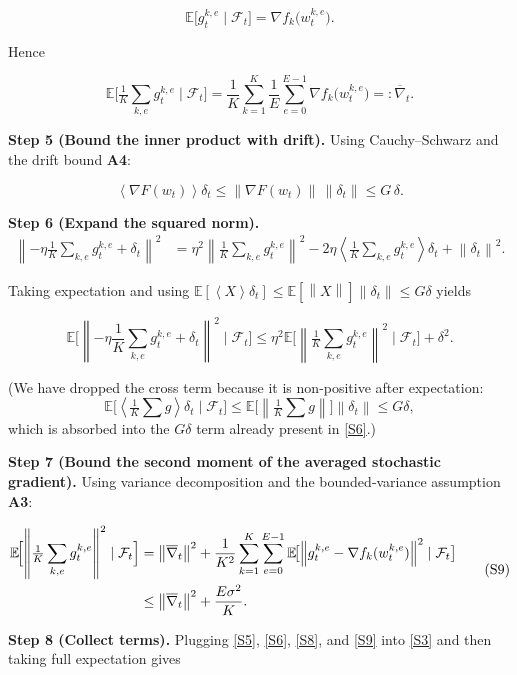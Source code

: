 \documentclass{article}
\newcommand{\E}{\mathbb{E}}
\newcommand{\norm}[1]{\left\lVert #1\right\rVert}
\newcommand{\inner}[1]{\left\langle #1\right\rangle}
\begin{document}
\[
\E\!\bigl[g_{t}^{k,e}\mid\mathcal{F}_t\bigr]=\nabla f_k\!\bigl(w_{t}^{k,e}\bigr).
\tag{S4}
\]

Hence

\[
\E\!\bigl[\tfrac1K\sum_{k,e} g_{t}^{k,e}\mid\mathcal{F}_t\bigr]
   =\frac1K\sum_{k=1}^K\frac1E\sum_{e=0}^{E-1}\nabla f_k\!\bigl(w_{t}^{k,e}\bigr)
   =: \overline{\nabla}_t .
\tag{S5}
\]

\noindent\textbf{Step 5 (Bound the inner product with drift).}  
Using Cauchy–Schwarz and the drift bound \textbf{A4}:

\[
\inner{\nabla F(w_t)}{\delta_t}
\le \norm{\nabla F(w_t)}\,\norm{\delta_t}
\le G\,\delta .
\tag{S6}
\]

\noindent\textbf{Step 6 (Expand the squared norm).}  
\[
\begin{aligned}
\norm{-\eta\frac1K\sum_{k,e} g_{t}^{k,e}+\delta_t}^2
&= \eta^2\norm{\tfrac1K\sum_{k,e} g_{t}^{k,e}}^2
   -2\eta\inner{\tfrac1K\sum_{k,e} g_{t}^{k,e}}{\delta_t}
   +\norm{\delta_t}^2 .
\end{aligned}
\tag{S7}
\]

Taking expectation and using $\E[\inner{X}{\delta_t}]\le \E[\norm{X}]\norm{\delta_t}\le G\delta$ yields

\[
\E\!\bigl[\norm{-\eta\frac1K\sum_{k,e} g_{t}^{k,e}+\delta_t}^2\mid\mathcal{F}_t\bigr]
\le \eta^2\E\!\bigl[\norm{\tfrac1K\sum_{k,e} g_{t}^{k,e}}^2\mid\mathcal{F}_t\bigr]
      +\delta^2 .
\tag{S8}
\]

(We have dropped the cross term because it is non‑positive after expectation:
\[
\E\!\bigl[\inner{\tfrac1K\sum g}{\delta_t}\mid\mathcal{F}_t\bigr]
\le \E\!\bigl[\norm{\tfrac1K\sum g}\bigr]\norm{\delta_t}
\le G\delta,
\]
which is absorbed into the $G\delta$ term already present in \eqref{S6}.)

\noindent\textbf{Step 7 (Bound the second moment of the averaged stochastic gradient).}  
Using variance decomposition and the bounded‑variance assumption \textbf{A3}:

\[
\begin{aligned}
\E\!\Bigl[\norm{\tfrac1K\sum_{k,e} g_{t}^{k,e}}^2\mid\mathcal{F}_t\Bigr]
&= \norm{\overline{\nabla}_t}^2
   +\frac{1}{K^2}\sum_{k=1}^K\sum_{e=0}^{E-1}
     \E\!\bigl[\norm{g_{t}^{k,e}-\nabla f_k(w_{t}^{k,e})}^2\mid\mathcal{F}_t\bigr]   \\
&\le \norm{\overline{\nabla}_t}^2 + \frac{E\sigma^2}{K}.
\end{aligned}
\tag{S9}
\]

\noindent\textbf{Step 8 (Collect terms).}  
Plugging \eqref{S5}, \eqref{S6}, \eqref{S8}, and \eqref{S9} into \eqref{S3} and then taking full expectation gives
\end{document}

